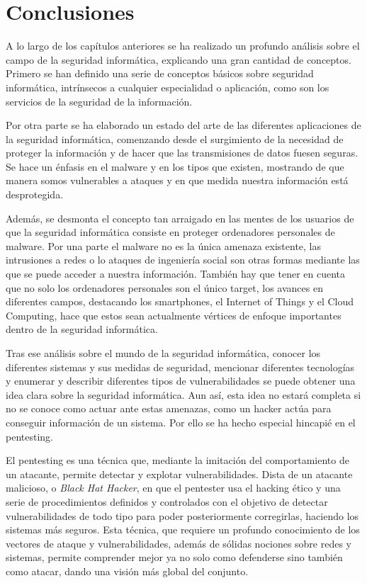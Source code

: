 \chapter{Conclusiones}

A lo largo de los capítulos anteriores se ha realizado un profundo análisis sobre el campo de la seguridad informática, explicando una gran cantidad de conceptos. Primero se han definido una serie de conceptos básicos sobre seguridad informática, intrínsecos a cualquier especialidad o aplicación, como son los servicios de la seguridad de la información.

Por otra parte se ha elaborado un estado del arte de las diferentes aplicaciones de la seguridad informática, comenzando desde el surgimiento de la necesidad de proteger la información y de hacer que las transmisiones de datos fuesen seguras. Se hace un énfasis en el malware y en los tipos que existen, mostrando de que manera somos vulnerables a ataques y en que medida nuestra información está desprotegida. 

Además, se desmonta el concepto tan arraigado en las mentes de los usuarios de que la seguridad informática consiste en proteger ordenadores personales de malware. Por una parte el malware no es la única amenaza existente, las intrusiones a redes o lo ataques de ingeniería social son otras formas mediante las que se puede acceder a nuestra información. También hay que tener en cuenta que no solo los ordenadores personales son el único target, los avances en diferentes campos, destacando los smartphones, el Internet of Things y el Cloud Computing, hace que estos sean actualmente vértices de enfoque importantes dentro de la seguridad informática.

Tras ese análisis sobre el mundo de la seguridad informática, conocer los diferentes sistemas y sus medidas de seguridad, mencionar diferentes tecnologías y enumerar y describir diferentes tipos de vulnerabilidades se puede obtener una idea clara sobre la seguridad informática. Aun así, esta idea no estará completa si no se conoce como actuar ante estas amenazas, como un hacker actúa para conseguir información de un sistema. Por ello se ha hecho especial hincapié en el pentesting. 

El pentesting es una técnica que, mediante la imitación del comportamiento de un atacante, permite detectar y explotar vulnerabilidades. Dista de un atacante malicioso, o \textit{Black Hat Hacker}, en que el pentester usa el hacking ético y una serie de procedimientos definidos y controlados con el objetivo de detectar vulnerabilidades de todo tipo para poder posteriormente corregirlas, haciendo los sistemas más seguros. Esta técnica, que requiere un profundo conocimiento de los vectores de ataque y vulnerabilidades, además de sólidas nociones sobre redes y sistemas, permite comprender mejor ya no solo como defenderse sino también como atacar, dando una visión más global del conjunto.

